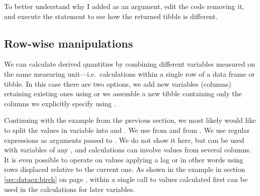 \documentclass[krantz2,ChapterTOCs]{krantz}\usepackage{knitr}
\begin{document}
\begin{playground}
To better understand why I added  as an argument, edit the code removing it, and execute the statement to see how the returned tibble is different.
\end{playground}

\subsection{Row-wise manipulations}

We can calculate derived quantities by combining different variables measured on the same measuring unit---i.e.\ calculations within a single row of a data frame or tibble. In this case there are two options, we add new variables (columns) retaining existing ones using  or we assemble a new tibble containing only the columns we explicitly specify using .

Continuing with the example from the previous section, we most likely would like to split the values in variable  into  and . We use  from  and  from . We use regular expressions as arguments passed to .  We do not show it here, but  can be used with variables of any , and calculations can involve values from several columns. It is even possible to operate on values applying a lag or in other words using rows displaced relative to the current one. As shown in the example in section \ref{sec:dataex:birch} on page \pageref{sec:dataex:birch}, within a single call to  values calculated first can be used in the calculations for later variables.
\end{document}
